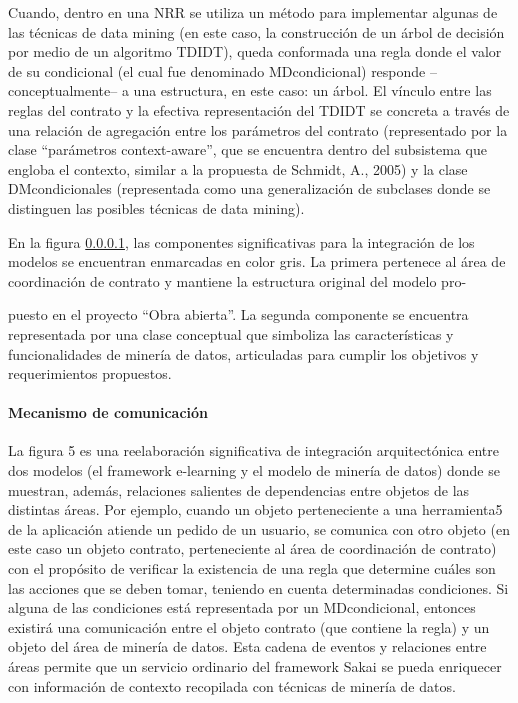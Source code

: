 Cuando, dentro en una NRR se utiliza un método para implementar
algunas de las técnicas de data mining (en este caso, la construcción de un
árbol de decisión por medio de un algoritmo TDIDT), queda conformada una
regla donde el valor de su condicional (el cual fue denominado MDcondicional)
responde –conceptualmente– a una estructura, en este caso: un árbol.
El vínculo entre las reglas del contrato y la efectiva representación del TDIDT
se concreta a través de una relación de agregación entre los parámetros del
contrato (representado por la clase “parámetros context-aware”, que se encuentra
dentro del subsistema que engloba el contexto, similar a la propuesta de
Schmidt, A., 2005) y la clase DMcondicionales (representada como una
generalización de subclases donde se distinguen las posibles técnicas de data
mining).

En la figura \ref{}, las componentes significativas para la integración de los
modelos se encuentran enmarcadas en color gris. La primera pertenece al área
de coordinación de contrato y mantiene la estructura original del modelo pro-

puesto en el proyecto “Obra abierta”. La segunda componente se encuentra
representada por una clase conceptual que simboliza las características y funcionalidades
de minería de datos, articuladas para cumplir los objetivos y
requerimientos propuestos.

\paragraph{Mecanismo de comunicación}

La figura 5 es una reelaboración significativa de integración arquitectónica
entre dos modelos (el framework e-learning y el modelo de minería de datos)
donde se muestran, además, relaciones salientes de dependencias entre objetos
de las distintas áreas. Por ejemplo, cuando un objeto perteneciente a una
herramienta5 de la aplicación atiende un pedido de un usuario, se comunica
con otro objeto (en este caso un objeto contrato, perteneciente al área de
coordinación de contrato) con el propósito de verificar la existencia de una
regla que determine cuáles son las acciones que se deben tomar, teniendo en
cuenta determinadas condiciones. Si alguna de las condiciones está representada
por un MDcondicional, entonces existirá una comunicación entre el
objeto contrato (que contiene la regla) y un objeto del área de minería de
datos. Esta cadena de eventos y relaciones entre áreas permite que un servicio
ordinario del framework Sakai se pueda enriquecer con información de contexto
recopilada con técnicas de minería de datos.

